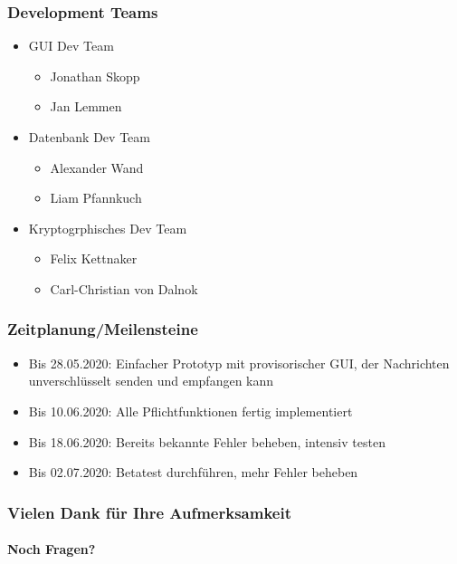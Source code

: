 \documentclass[t]{beamer}
\begin{document}
	
	
	
	\begin{frame}
		\frametitle{Development Teams}
        \pause
			\begin{itemize}
			
					\item GUI Dev Team						
						\begin{itemize}
						
							\item Jonathan Skopp
							\item Jan Lemmen
							\pause
						\end{itemize}
					
					\item Datenbank Dev Team
						\begin{itemize}
						
							\item Alexander Wand
							\item Liam Pfannkuch
							\pause
							
						\end{itemize}
					
					\item Kryptogrphisches Dev Team
						\begin{itemize}
						
							\item Felix Kettnaker
							\item Carl-Christian von Dalnok
						\end{itemize}
				
			\end{itemize}

	\end{frame}



    \begin{frame}
        \frametitle{Zeitplanung/Meilensteine}
        \pause

        \begin{itemize}
            \item Bis 28.05.2020:
                Einfacher Prototyp mit provisorischer GUI, der Nachrichten unverschlüsselt senden und empfangen kann
                \pause
            
            \item Bis 10.06.2020:
                Alle Pflichtfunktionen fertig implementiert
                \pause
            
            \item Bis 18.06.2020:
                Bereits bekannte Fehler beheben, intensiv testen
                \pause

            \item Bis 02.07.2020:
                Betatest durchführen, mehr Fehler beheben
        \end{itemize}
    \end{frame}

	\begin{frame}
		\frametitle{Vielen Dank für Ihre Aufmerksamkeit}
		\framesubtitle{Noch Fragen?}
	\end{frame}
\end{document}
